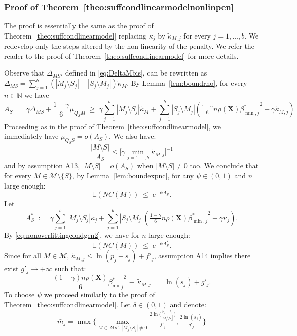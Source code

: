 \documentclass[aos]{imsart}
\theoremstyle{plain}
\newcommand{\E}{\mathbb{E}}
\newcommand{\N}{\mathbb{N}}
\newcommand{\M}{\mathcal{M}}
\newcommand{\bs}{\boldsymbol}
\begin{document}
\subsubsection{Proof of Theorem~\ref{theo:suffcondlinearmodelnonlinpen}}
The proof is essentially the same as the proof of Theorem~\ref{theo:suffcondlinearmodel} replacing $\kappa_j$ by $\tilde{\kappa}_{M, j}$ for every $j=1,\ldots,b$. We redevelop only the steps altered by the non-linearity of the penalty. We refer the reader to the proof of Theorem~\ref{theo:suffcondlinearmodel} for more details.

Observe that $\Delta_{MS}$, defined in \eqref{eq:DeltaMbis}, can be rewritten as $\Delta_{MS}=\sum_{j=1}^b(|M_j\setminus S_j|-|S_j\setminus M_j|)\tilde{\kappa}_{M}$. By  Lemma~\ref{lem:boundrho}, for every $n\in \N$ we have 
\begin{equation}\label{eq:nonoverfittingcondgen2}
   A_S\;=\; \gamma \Delta_{MS}+\frac{1-\gamma}{6}\mu_{Q_SM}\;\geq\; \gamma\sum_{j=1}^b|M_j \setminus S_j|\tilde{\kappa}_{M} + \sum_{j=1}^b |S_j\setminus M_j |\left(\tfrac{1-\gamma}{6} n \rho(\bs X) {\beta^*_{\min,j}}^{2} - \gamma\tilde{\kappa}_{M, j}\right) 
\end{equation} 
Proceeding as in the proof of Theorem~\ref{theo:suffcondlinearmodel}, we immediately have $\mu_{Q_S S}=o(A_S)$. We also have:
$$\frac{|M\setminus S|}{A_S}\leq \Big[ \gamma\min_{j=1,\ldots,b}\tilde{\kappa}_{M, j} \Big]^{-1} $$
and by assumption A13, $|M\setminus S|=o(A_S)$ when $|M\setminus S|\neq 0$ too.
We conclude that for every $M\in \mathcal M\setminus \{S\}$, by Lemma~\ref{lem:boundexpnc}, for any $\psi\in(0,1)$ and $n$ large enough:
$$
\E(NC(M))\;\leq\;e^{-\psi A_S}.
$$
Let 
$$A_S^*\;:=\;\gamma\sum_{j=1}^b|M_j \setminus S_j|\kappa_j + \sum_{j=1}^b |S_j\setminus M_j |\left(\tfrac{1-\gamma}{6} n \rho(\bs X) {\beta^*_{\min,j}}^{2} - \gamma\kappa_j\right).$$
By \eqref{eq:nonoverfittingcondgen2}, we have for $n$ large enough:
\begin{equation}\label{eq:boundexp3}
    \E(NC(M))\;\leq\;e^{-\psi A_S^*}.
\end{equation}
Since for all $M\in\M$, $\tilde{\kappa}_{M, j} \leq \ln(p_j-s_j)+f'_j$, assumption A14 implies there exist $g'_j \to +\infty$ such that:
$$\frac{(1-\gamma) n\rho(\bs X)}{6}{{\beta_{\min}^*}_j}^2 \,- \,\tilde{\kappa}_{M, j} \;=\; \ln(s_j) + g'_{j}.$$
To choose $\psi$ we proceed similarly to the proof of Theorem~\ref{theo:suffcondlinearmodel}. Let $\delta \in (0,1)$ and denote:
$$\bar{m}_j=
    \max\bigg\{\max_{M\in\M\text{s.t.}|M_j\setminus S_j|\neq 0}\tfrac{2\ln\big(\tfrac{p_j-s_j}{|M_j\setminus S_j|}\big)}{f'_j},\tfrac{2\ln(s_j)}{g'_{j}}\bigg\}$$
\end{document}
